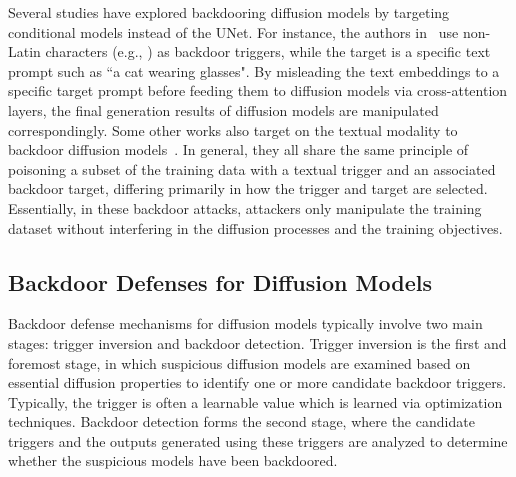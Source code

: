 Several studies have explored backdooring diffusion models by targeting conditional models instead of the UNet. For instance, the authors in~\cite{struppek2023rickrolling} use non-Latin characters (e.g., \Smiley{}) as backdoor triggers, while the target is a specific text prompt such as ``a cat wearing glasses". By misleading the text embeddings to a specific target prompt before feeding them to diffusion models via cross-attention layers, the final generation results of diffusion models are manipulated correspondingly. Some other works also target on the textual modality to backdoor diffusion models~\cite{zhai2023text, pan2023trojan, wang2023stronger}. In general, they all share the same principle of poisoning a subset of the training data with a textual trigger and an associated backdoor target, differing primarily in how the trigger and target are selected. 
Essentially, in these backdoor attacks, attackers only manipulate the training dataset without interfering in the diffusion processes and the training objectives.


\subsection{Backdoor Defenses for Diffusion Models}
Backdoor defense mechanisms for diffusion models typically involve two main stages: trigger inversion and backdoor detection. Trigger inversion is the first and foremost stage, in which suspicious diffusion models are examined based on essential diffusion properties to identify one or more candidate backdoor triggers. Typically, the trigger is often a learnable value which is learned via optimization techniques\cite{truong2024attacks}. Backdoor detection forms the second stage, where the candidate triggers and the outputs generated using these triggers are analyzed to determine whether the suspicious models have been backdoored. 

